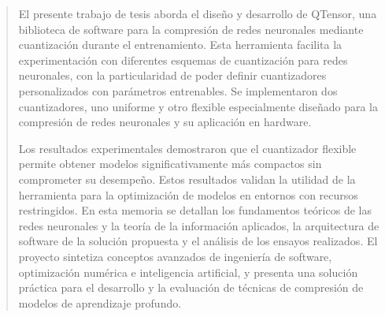 \documentclass[
    11pt,
    spanish,
    singlespacing,
    parskip,
    headsepline,
    bookmarks=true,
    unicode=true,
    pdftoolbar=true,
    pdfmenubar=true,
    pdffitwindow=false,
    colorlinks=true,
    linkcolor=blue,
    citecolor=blue,
    urlcolor=blue
]{MastersDoctoralThesis}
\def\texttt#1{#1}%
\begin{document}



\frontmatter %
\pagestyle{plain} %


\begin{abstract}
\addchaptertocentry{\abstractname} %
El presente trabajo de tesis aborda el diseño y desarrollo de \texttt{QTensor}, una biblioteca de software para la compresión de redes neuronales mediante cuantización durante el entrenamiento. Esta herramienta facilita la experimentación con diferentes esquemas de cuantización para redes neuronales, con la particularidad de poder definir cuantizadores personalizados con parámetros entrenables. Se implementaron dos cuantizadores, uno uniforme y otro flexible especialmente diseñado para la compresión de redes neuronales y su aplicación en hardware.

Los resultados experimentales demostraron que el cuantizador flexible permite obtener modelos significativamente más compactos sin comprometer su desempeño. Estos resultados validan la utilidad de la herramienta para la optimización de modelos en entornos con recursos restringidos. En esta memoria se detallan los fundamentos teóricos de las redes neuronales y la teoría de la información aplicados, la arquitectura de software de la solución propuesta y el análisis de los ensayos realizados. El proyecto sintetiza conceptos avanzados de ingeniería de software, optimización numérica e inteligencia artificial, y presenta una solución práctica para el desarrollo y la evaluación de técnicas de compresión de modelos de aprendizaje profundo.
\end{abstract}


\end{document}
